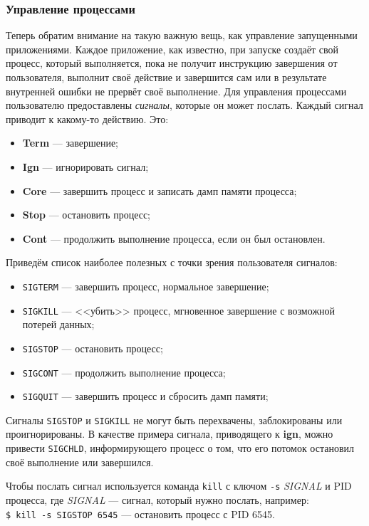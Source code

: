 \subsubsection{Управление процессами}\label{base:os:structure:userutils:processes}
Теперь обратим внимание на такую важную вещь, как управление запущенными приложениями. Каждое приложение, как известно, при запуске создаёт свой процесс, который выполняется, пока не получит инструкцию завершения от пользователя, выполнит своё действие и завершится сам или в результате внутренней ошибки не прервёт своё выполнение.
Для управления процессами пользователю предоставлены \emph{сигналы}, которые он может послать. Каждый сигнал приводит к какому-то действию. Это:
\begin{itemize}
 \item \textbf{Term} --- завершение;
 \item \textbf{Ign} --- игнорировать сигнал;
 \item \textbf{Core} --- завершить процесс и записать дамп памяти процесса;
 \item \textbf{Stop} --- остановить процесс;
 \item \textbf{Cont} --- продолжить выполнение процесса, если он был остановлен.
\end{itemize}
Приведём список наиболее полезных с точки зрения пользователя сигналов:
\begin{itemize}
 \item \texttt{SIGTERM} --- завершить процесс, нормальное завершение;
 \item \texttt{SIGKILL} --- <<убить>> процесс, мгновенное завершение с возможной потерей данных;
 \item \texttt{SIGSTOP} --- остановить процесс;
 \item \texttt{SIGCONT} --- продолжить выполнение процесса;
 \item \texttt{SIGQUIT} --- завершить процесс и сбросить дамп памяти;
\end{itemize}
Сигналы \texttt{SIGSTOP} и \texttt{SIGKILL} не могут быть перехвачены, заблокированы или проигнорированы. В качестве примера сигнала, приводящего к \textbf{ign}, можно привести \texttt{SIGCHLD}, информирующего процесс о том, что его потомок остановил своё выполнение или завершился.

Чтобы послать сигнал используется команда \texttt{kill} с ключом \texttt{-s} \emph{SIGNAL} и PID процесса, где \emph{SIGNAL} --- сигнал, который нужно послать, например:\\
\texttt{\$ kill -s SIGSTOP 6545} --- остановить процесс с PID 6545.

